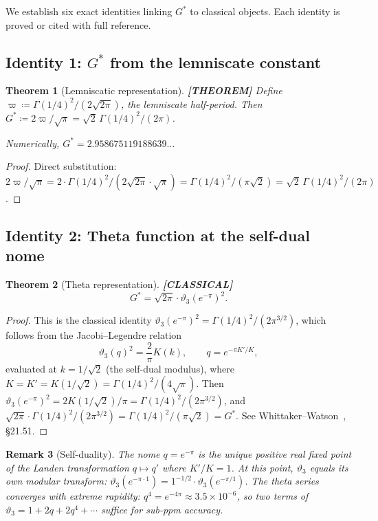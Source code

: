 \documentclass[11pt]{article}
\theoremstyle{tight}
\newtheorem{theorem}{Theorem}[section]
\theoremstyle{plainroman}
\newtheorem{remark}[theorem]{Remark}
\begin{document}
We establish six exact identities linking $G^*$ to classical objects.
Each identity is proved or cited with full reference.

\subsection{Identity 1: $G^*$ from the lemniscate constant}

\begin{theorem}[Lemniscatic representation]\label{thm:gstar-varpi}
\textbf{[THEOREM]}
Define $\varpi\coloneqq\Gamma(1/4)^2/(2\sqrt{2\pi})$, the lemniscate half-period.
Then $G^*\coloneqq 2\varpi/\sqrt{\pi}=\sqrt{2}\,\Gamma(1/4)^2/(2\pi)$.

Numerically, $G^*=2.958675119188639\ldots$
\end{theorem}
\begin{proof}
Direct substitution: $2\varpi/\sqrt{\pi}=2\cdot\Gamma(1/4)^2/(2\sqrt{2\pi}\cdot\sqrt{\pi})=\Gamma(1/4)^2/(\pi\sqrt{2})=\sqrt{2}\,\Gamma(1/4)^2/(2\pi)$.
\end{proof}

\subsection{Identity 2: Theta function at the self-dual nome}

\begin{theorem}[Theta representation]\label{thm:gstar-theta}
\textbf{[CLASSICAL]}
\[
G^*=\sqrt{2\pi}\cdot\vartheta_3(e^{-\pi})^2.
\]
\end{theorem}
\begin{proof}
This is the classical identity $\vartheta_3(e^{-\pi})^2=\Gamma(1/4)^2/(2\pi^{3/2})$, which follows from the Jacobi--Legendre relation
\[
\vartheta_3(q)^2=\frac{2}{\pi}K(k), \qquad q=e^{-\pi K'/K},
\]
evaluated at $k=1/\sqrt{2}$ (the self-dual modulus), where $K=K'=K(1/\sqrt{2})=\Gamma(1/4)^2/(4\sqrt{\pi})$.
Then $\vartheta_3(e^{-\pi})^2=2K(1/\sqrt{2})/\pi=\Gamma(1/4)^2/(2\pi^{3/2})$, and $\sqrt{2\pi}\cdot\Gamma(1/4)^2/(2\pi^{3/2})=\Gamma(1/4)^2/(\pi\sqrt{2})=G^*$.
See Whittaker--Watson~\cite{whittaker}, \S21.51.
\end{proof}

\begin{remark}[Self-duality]\label{rem:selfdual}
The nome $q=e^{-\pi}$ is the unique positive real fixed point of the Landen transformation $q\mapsto q'$ where $K'/K=1$.
At this point, $\vartheta_3$ equals its own modular transform: $\vartheta_3(e^{-\pi\cdot 1})=1^{-1/2}\cdot\vartheta_3(e^{-\pi/1})$.
The theta series converges with extreme rapidity: $q^4=e^{-4\pi}\approx 3.5\times 10^{-6}$, so two terms of $\vartheta_3=1+2q+2q^4+\cdots$ suffice for sub-ppm accuracy.
\end{remark}
\end{document}
